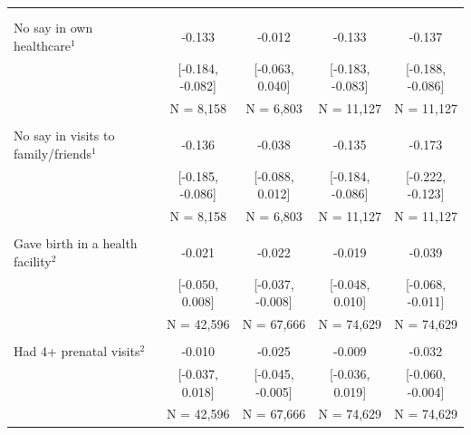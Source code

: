 \begin{tabular}{lcccc}
\toprule
 &  &  &  &  \\\\
\midrule
No say in own healthcare$^1$&-0.133&-0.012&-0.133&-0.137\\
&[-0.184, -0.082]&[-0.063, 0.040]&[-0.183, -0.083]&[-0.188, -0.086]\\
&N = 8,158&N = 6,803&N = 11,127&N = 11,127\\
&&&&\\
No say in visits to family/friends$^1$&-0.136&-0.038&-0.135&-0.173\\
&[-0.185, -0.086]&[-0.088, 0.012]&[-0.184, -0.086]&[-0.222, -0.123]\\
&N = 8,158&N = 6,803&N = 11,127&N = 11,127\\
&&&&\\
Gave birth in a health facility$^2$&-0.021&-0.022&-0.019&-0.039\\
&[-0.050, 0.008]&[-0.037, -0.008]&[-0.048, 0.010]&[-0.068, -0.011]\\
&N = 42,596&N = 67,666&N = 74,629&N = 74,629\\
&&&&\\
Had 4+ prenatal visits$^2$&-0.010&-0.025&-0.009&-0.032\\
&[-0.037, 0.018]&[-0.045, -0.005]&[-0.036, 0.019]&[-0.060, -0.004]\\
&N = 42,596&N = 67,666&N = 74,629&N = 74,629\\
\bottomrule
\end{tabular}
